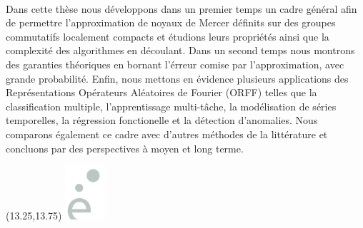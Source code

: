 \begin{textblock}{11.5}
{{\begin{multicols}{2}
        \paragraph{}
        Dans cette th\`ese nous d\'eveloppons dans un premier temps un cadre
        g\'en\'eral afin de permettre l'approximation de noyaux de Mercer
        d\'efinits sur des groupes commutatifs localement compacts et
        \'etudions leurs propri\'et\'es ainsi que la complexit\'e des
        algorithmes en d\'ecoulant. Dans un second temps nous montrons des
        garanties th\'eoriques en bornant l'\'erreur comise par
        l'approximation, avec grande probabilit\'e. Enfin, nous mettons en
        \'evidence plusieurs applications des Repr\'esentations Op\'erateurs
        Al\'eatoires de Fourier (\acs{ORFF}) telles que la classification
        multiple, l'apprentissage multi-t\^ache, la mod\'elisation de s\'eries
        temporelles, la r\'egression fonctionelle et la d\'etection
        d'anomalies. Nous comparons \'egalement ce cadre avec d'autres
        m\'ethodes de la litt\'erature et concluons par des perspectives \`a
        moyen et long terme.
    \end{multicols}}}
\end{textblock}

\vspace*{\fill}

\begin{textblock}{13} (13.25,13.75)
    \includegraphics[height=2cm]{../gfx/logoEgrey.png}
\end{textblock}
